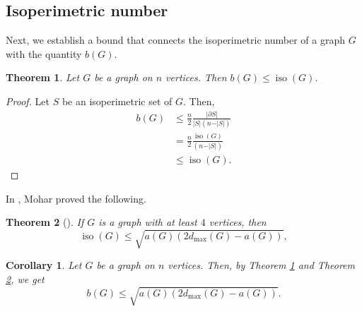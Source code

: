 \documentclass[12pt]{article}
\newtheorem{theorem}{Theorem}[section]
\newtheorem{cor}{Corollary}[section]
\DeclareMathOperator{\iso}{iso}
\begin{document}
\subsection{Isoperimetric number}\label{iso-connection}
 Next, we establish a bound that connects the isoperimetric number of a graph $G$ with the quantity $b(G)$.
\begin{theorem}\label{b(g)-iso}
    Let $G$ be a graph on $n$ vertices. Then $b(G) \leq \iso(G)$.
\end{theorem} 
\begin{proof}
    Let $S$ be an isoperimetric set of $G$. Then,
\begin{align*}
   b(G) &\leq \frac{n}{2} \frac{\vert \partial S\vert}{\vert S\vert(n-\vert S\vert)} \\ 
   &= \frac{n}{2} \frac{\iso(G)}{(n-\vert S\vert)} \\
   &\leq \iso(G).
\end{align*}
   
\end{proof}
In \cite{mohar-isoperi-jctb}, Mohar proved the following.
\begin{theorem}[{\cite[Theorem 4.2]{mohar-isoperi-jctb}}] \label{iso-a(G)}
If $G$ is a graph with at least $4$ vertices, then 
$$
\iso(G) \leq \sqrt{a(G)(2 d_{\max}(G) - a(G))},
$$
\end{theorem}


\begin{cor}
Let $G$ be a graph on $n$ vertices. Then, by Theorem \ref{b(g)-iso} and Theorem \ref{iso-a(G)}, we get \begin{equation}\label{b(g)-a(g)-compare}
 b(G) \leq \sqrt{a(G)(2 d_{\max}(G) - a(G))}.    
\end{equation} 
\end{cor}
\end{document}

